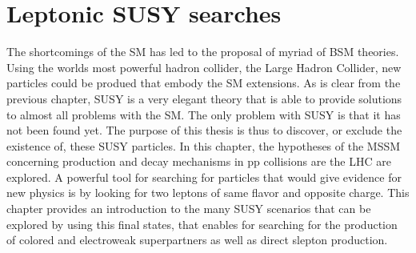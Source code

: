 \chapter{Leptonic SUSY searches} \label{search}
\noindent\justify
The shortcomings of the SM has led to the proposal of myriad of BSM theories. 
Using the worlds most powerful hadron collider, the Large Hadron Collider, new particles could be produed that embody the SM extensions. 
As is clear from the previous chapter, SUSY is a very elegant theory that is able to provide solutions to almost all problems with the SM. 
The only problem with SUSY is that it has not been found yet. 
The purpose of this thesis is thus to discover, or exclude the existence of, these SUSY particles. 
\newpara
\noindent\justify
In this chapter, the hypotheses of the MSSM concerning production and decay mechanisms in pp collisions are the LHC are explored. 
A powerful tool for searching for particles that would give evidence for new physics is by looking for two leptons of same flavor and opposite charge. 
This chapter provides an introduction to the many SUSY scenarios that can be explored by using this final states, that enables for searching for the production of colored and electroweak superpartners as well as direct slepton production. 
\newpage
